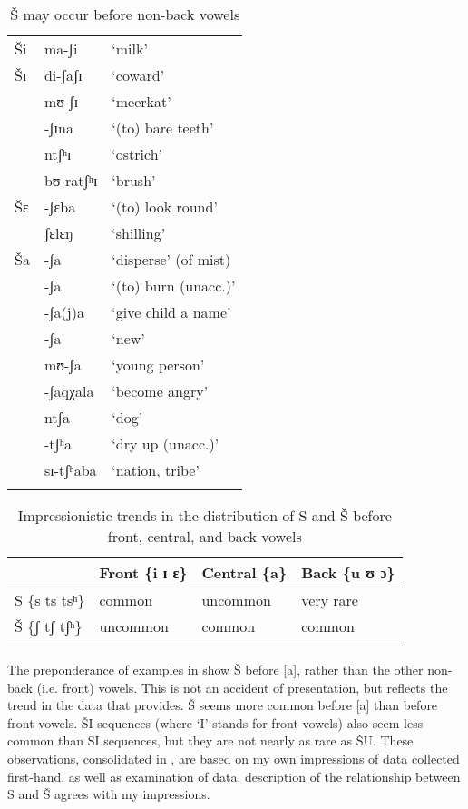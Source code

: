 \begin{table}[p]
\begin{tabularx}{\textwidth}{XXX}
\lsptoprule 
{Ši} & ma-ʃi & {‘milk’} \\ 
\tablevspace
{Šɪ} & di-ʃaʃɪ & {‘coward’} \\
& mʊ-ʃɪ & ‘meerkat’ \\
& -ʃɪna & ‘(to) bare teeth’  \\
& ntʃʰɪ & ‘ostrich’  \\
& bʊ-ratʃʰɪ & ‘brush’ \\ 
\tablevspace
 {Šɛ} & -ʃɛba & {‘(to) look round’} \\
& ʃɛlɛŋ & ‘shilling’ \\ 
\tablevspace
{Ša} &-ʃa & {‘disperse’ (of mist)} \\
& -ʃa & ‘(to) burn (unacc.)’  \\
&-ʃa(j)a & ‘give child a name’ \\ 
&-ʃa & ‘new’ \\ 
&mʊ-ʃa & ‘young person’ \\ 
&-ʃaqχala & ‘become angry’ \\ 
&ntʃa & ‘dog’ \\ 
&-tʃʰa & ‘dry up (unacc.)’ \\ 
&sɪ-tʃʰaba & ‘nation, tribe’ \\
\lspbottomrule
\end{tabularx}
\caption{Š may occur before non-back vowels \citep{Cole1955}}
\label{tab:bennett:7}
\end{table}

\begin{table}[p]
\begin{tabularx}{\textwidth}{XXXX}
\lsptoprule
& Front \{i ɪ ɛ\} & Central \{a\} & Back \{u ʊ ɔ\}\\
\midrule
S \{s ts tsʰ\} & common & uncommon & very rare\\
Š \{ʃ tʃ tʃʰ\} & uncommon & common & common\\
\lspbottomrule
\end{tabularx}
\caption{Impressionistic trends in the distribution of S and Š before front, central, and back vowels}
\label{tab:bennett:8}
\end{table}

The preponderance of examples in  show Š before [a], rather than the other non-back (i.e. front) vowels. This is not an accident of presentation, but reflects the trend in the data that \citet{Cole1955} provides. Š seems more common before [a] than before front vowels. ŠI sequences (where ‘I’ stands for front vowels) also seem less common than SI sequences, but they are not nearly as rare as ŠU. These observations, consolidated in , are based on my own impressions of data collected first-hand, as well as examination of  data.  description of the relationship between S and Š agrees with my impressions.



